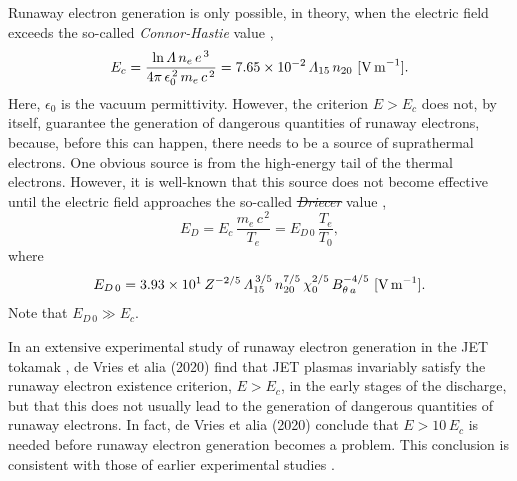 \documentclass{iopjournal}
\providecommand{\DIFadd}[1]{{\protect\color{blue}\uwave{#1}}} %
\providecommand{\DIFdel}[1]{{\protect\color{red}\sout{#1}}}                      %
\providecommand{\DIFaddbegin}{} %
\providecommand{\DIFaddend}{} %
\providecommand{\DIFdelbegin}{} %
\providecommand{\DIFdelend}{} %
\newcommand{\DIFscaledelfig}{0.5}
\newlength{\DIFdelgraphicswidth} %
\newlength{\DIFdelgraphicsheight} %
\newcommand{\DIFaddincludegraphics}[2][]{{\color{blue}\fbox{\DIFOincludegraphics[#1]{#2}}}} %
\newcommand{\DIFdelincludegraphics}[2][]{%
\sbox{\DIFdelgraphicsbox}{\DIFOincludegraphics[#1]{#2}}%
\settoboxwidth{\DIFdelgraphicswidth}{\DIFdelgraphicsbox} %
\settoboxtotalheight{\DIFdelgraphicsheight}{\DIFdelgraphicsbox} %
\scalebox{\DIFscaledelfig}{%
\parbox[b]{\DIFdelgraphicswidth}{\usebox{\DIFdelgraphicsbox}\\[-\baselineskip] \rule{\DIFdelgraphicswidth}{0em}}\llap{\resizebox{\DIFdelgraphicswidth}{\DIFdelgraphicsheight}{%
\setlength{\unitlength}{\DIFdelgraphicswidth}%
\begin{picture}(1,1)%
\thicklines\linethickness{2pt} %
{\color[rgb]{1,0,0}\put(0,0){\framebox(1,1){}}}%
{\color[rgb]{1,0,0}\put(0,0){\line( 1,1){1}}}%
{\color[rgb]{1,0,0}\put(0,1){\line(1,-1){1}}}%
\end{picture}%
}\hspace*{3pt}}} %
} %
\DeclareRobustCommand{\DIFaddbegin}{\DIFOaddbegin \let\includegraphics\DIFaddincludegraphics} %
\DeclareRobustCommand{\DIFaddend}{\DIFOaddend \let\includegraphics\DIFOincludegraphics} %
\DeclareRobustCommand{\DIFdelbegin}{\DIFOdelbegin \let\includegraphics\DIFdelincludegraphics} %
\DeclareRobustCommand{\DIFdelend}{\DIFOaddend \let\includegraphics\DIFOincludegraphics} %
\begin{document}
 Runaway electron generation is only possible, in theory,  when the electric field exceeds the so-called {\em Connor-Hastie}\/ value \cite{connor},
 \begin{equation}
 E_c = \frac{\ln{\mit\Lambda}\,n_e\,e^{\,3}}{4\pi\,\epsilon_0^{\,2}\,m_e\,c^{\,2}} = 7.65\times 10^{-2}\,{\mit\Lambda}_{15}\,n_{20}\,\,[{\rm V\,m}^{-1}].
 \end{equation}
 Here, $\epsilon_0$ is the vacuum permittivity. 
 However, the criterion $E>E_c$ does not,  by itself, guarantee the generation of dangerous quantities of runaway electrons, because, before this
 can happen, there needs to be a source of suprathermal electrons. One obvious source is from the high-energy tail of the thermal electrons. However,
 it is well-known that this source does not become effective until the electric field approaches the so-called {\em \DIFdelbegin \DIFdel{Driecer}\DIFdelend \DIFaddbegin \DIFadd{Dreicer}\DIFaddend }\/ value \cite{dreicer},
 \begin{equation}
 E_D = E_c\,\frac{m_e\,c^{\,2}}{T_e}= E_{D\,0}\,\frac{T_e}{T_0},
 \end{equation}
 where
 \begin{equation}
 E_{D\,0} = 3.93\times 10^{1}\,Z^{-2/5}\,{\mit\Lambda}_{15}^{\,3/5}\,n_{20}^{7/5}\,\chi_0^{2/5}\,B_{\theta\,a}^{-4/5}\,\,[{\rm V\,m}^{-1}].
 \end{equation}
 Note that $E_{D\,0}\gg E_c$. 

 In an extensive experimental study of runaway electron generation in the JET tokamak \cite{run}, de Vries et alia (2020) find that JET
  plasmas invariably satisfy the runaway electron existence criterion, $E>E_c$, in the early stages of the discharge, but that this does not
 usually lead to the generation of dangerous quantities of runaway electrons. In fact, de Vries et alia (2020) conclude that $E>10\,E_c$ is
 needed before runaway electron generation becomes a problem. This conclusion is consistent with those of earlier experimental 
 studies \cite{granetz,paz,pop}.
\end{document}
